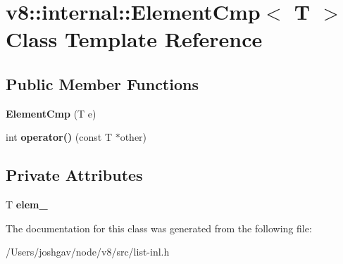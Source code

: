 \hypertarget{classv8_1_1internal_1_1_element_cmp}{}\section{v8\+:\+:internal\+:\+:Element\+Cmp$<$ T $>$ Class Template Reference}
\label{classv8_1_1internal_1_1_element_cmp}
\subsection*{Public Member Functions}
\begin{DoxyCompactItemize}
\item 
{\bfseries Element\+Cmp} (T e)\hypertarget{classv8_1_1internal_1_1_element_cmp_aecd8238a4888d4967062f6e2bdb86827}{}\label{classv8_1_1internal_1_1_element_cmp_aecd8238a4888d4967062f6e2bdb86827}

\item 
int {\bfseries operator()} (const T $\ast$other)\hypertarget{classv8_1_1internal_1_1_element_cmp_a9f140837259f8ff80943669ff9c9fe51}{}\label{classv8_1_1internal_1_1_element_cmp_a9f140837259f8ff80943669ff9c9fe51}

\end{DoxyCompactItemize}
\subsection*{Private Attributes}
\begin{DoxyCompactItemize}
\item 
T {\bfseries elem\+\_\+}\hypertarget{classv8_1_1internal_1_1_element_cmp_ae1b77e69ae099876c6493238f1b93074}{}\label{classv8_1_1internal_1_1_element_cmp_ae1b77e69ae099876c6493238f1b93074}

\end{DoxyCompactItemize}


The documentation for this class was generated from the following file\+:\begin{DoxyCompactItemize}
\item 
/\+Users/joshgav/node/v8/src/list-\/inl.\+h\end{DoxyCompactItemize}
